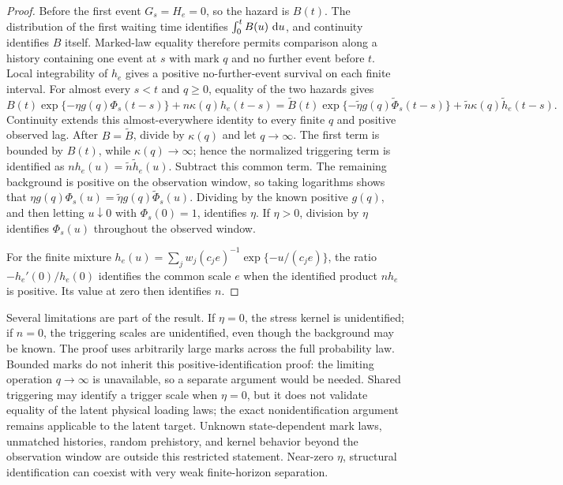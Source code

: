 \begin{proof}
Before the first event \(G_s=H_e=0\), so the hazard is \(B(t)\). The distribution of the first waiting time identifies \(\int_0^tB(u)\,\mathop{}\!\mathrm{d} u\), and continuity identifies \(B\) itself. Marked-law equality therefore permits comparison along a history containing one event at \(s\) with mark \(q\) and no further event before \(t\). Local integrability of \(h_e\) gives a positive no-further-event survival on each finite interval. For almost every \(s< t\) and \(q\ge0\), equality of the two hazards gives
\[
B(t)\exp\{-\eta g(q)\Phi_s(t-s)\}+n\kappa(q)h_e(t-s)
=
\widetilde B(t)\exp\{-\widetilde\eta g(q)\widetilde\Phi_s(t-s)\}
+\widetilde n\kappa(q)\widetilde h_e(t-s).
\]
Continuity extends this almost-everywhere identity to every finite \(q\) and positive observed lag. After \(B=\widetilde B\), divide by \(\kappa(q)\) and let \(q\to\infty\). The first term is bounded by \(B(t)\), while \(\kappa(q)\to\infty\); hence the normalized triggering term is identified as \(n h_e(u)=\widetilde n\widetilde h_e(u)\). Subtract this common term. The remaining background is positive on the observation window, so taking logarithms shows that \(\eta g(q)\Phi_s(u)=\widetilde\eta g(q)\widetilde\Phi_s(u)\). Dividing by the known positive \(g(q)\), and then letting \(u\downarrow0\) with \(\Phi_s(0)=1\), identifies \(\eta\). If \(\eta>0\), division by \(\eta\) identifies \(\Phi_s(u)\) throughout the observed window.

For the finite mixture \(h_e(u)=\sum_j w_j(c_je)^{-1}\exp\{-u/(c_je)\}\), the ratio \(-h_e'(0)/h_e(0)\) identifies the common scale \(e\) when the identified product \(n h_e\) is positive. Its value at zero then identifies \(n\).
\end{proof}

Several limitations are part of the result. If \(\eta=0\), the stress kernel is unidentified; if \(n=0\), the triggering scales are unidentified, even though the background may be known. The proof uses arbitrarily large marks across the full probability law. Bounded marks do not inherit this positive-identification proof: the limiting operation \(q\to\infty\) is unavailable, so a separate argument would be needed. Shared triggering may identify a trigger scale when \(\eta=0\), but it does not validate equality of the latent physical loading laws; the exact nonidentification argument remains applicable to the latent target. Unknown state-dependent mark laws, unmatched histories, random prehistory, and kernel behavior beyond the observation window are outside this restricted statement. Near-zero \(\eta\), structural identification can coexist with very weak finite-horizon separation.

